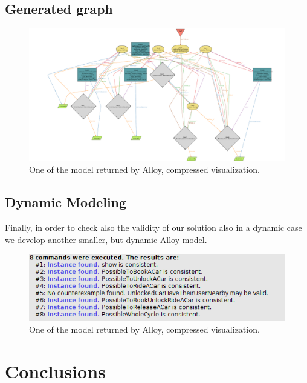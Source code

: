 \documentclass[11pt]{article} %
\begin{document}
\subsection{Generated graph}

\begin{figure}[H]
	\centering
	\includegraphics[width=1\textwidth]{Alloy/Complete.png}
	\caption{One of the model returned by Alloy, compressed visualization.}
\end{figure}

\subsection{Dynamic Modeling}

Finally, in order to check also the validity of our solution also in a dynamic case we develop another smaller, but dynamic Alloy model.



\begin{figure}[H]
	\centering
	\includegraphics[width=1\textwidth]{Alloy/DynamicConsistent.png}
	\caption{One of the model returned by Alloy, compressed visualization.}
\end{figure}

\newpage
\section{Conclusions}
\end{document}
